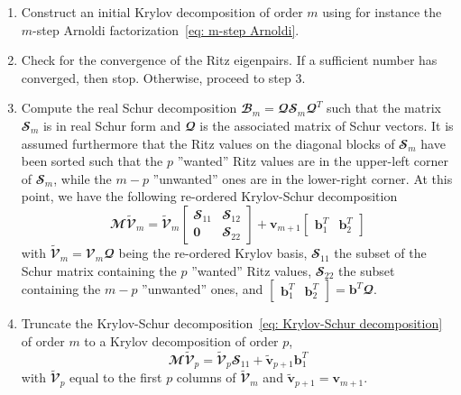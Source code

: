     \begin{enumerate}
      \item Construct an initial Krylov decomposition of order $m$ using for instance the $m$-step Arnoldi factorization~\eqref{eq: m-step Arnoldi}.

      \item Check for the convergence of the Ritz eigenpairs. If a sufficient number has converged, then stop. Otherwise, proceed to step 3.

      \item Compute the real Schur decomposition $\mathbfcal{B}_m = \mathbfcal{Q} \mathbfcal{S}_m \mathbfcal{Q}^T$ such that the matrix $\mathbfcal{S}_m$ is in real Schur form and $\mathbfcal{Q}$ is the associated matrix of Schur vectors. It is assumed furthermore that the Ritz values on the diagonal blocks of $\mathbfcal{S}_m$ have been sorted such that the $p$ ''wanted'' Ritz values are in the upper-left corner of $\mathbfcal{S}_m$, while the $m-p$ ''unwanted'' ones are in the lower-right corner. At this point, we have the following re-ordered Krylov-Schur decomposition
      \begin{equation}
        \mathbfcal{M} \tilde{\mathbfcal{V}}_m =
        \tilde{\mathbfcal{V}}_m
        \begin{bmatrix}
         \mathbfcal{S}_{11} & \mathbfcal{S}_{12} \\
         {\mathbf 0}     & \mathbfcal{S}_{22}
       \end{bmatrix}
       + {\mathbf v}_{m+1}\begin{bmatrix}
                           {\mathbf b}_{1}^T & {\mathbf b}_{2}^T
                           \end{bmatrix}
        \label{eq: Krylov-Schur decomposition}
      \end{equation}
      with $\tilde{\mathbfcal{V}}_m = \mathbfcal{V}_m  \mathbfcal{Q}$ being the re-ordered Krylov basis, $\mathbfcal{S}_{11}$ the subset of the Schur matrix containing the $p$ ''wanted'' Ritz values, $\mathbfcal{S}_{22}$ the subset containing the $m-p$ ''unwanted'' ones, and $\begin{bmatrix} {\mathbf b}_1^T & {\mathbf b}_2^T \end{bmatrix} = {\mathbf b}^T \mathbfcal{Q}$.

      \item Truncate the Krylov-Schur decomposition~\eqref{eq: Krylov-Schur decomposition} of order $m$ to a Krylov decomposition of order $p$,
        \begin{equation}
          \mathbfcal{M}\tilde{\mathbfcal{V}}_p = \tilde{\mathbfcal{V}}_p \mathbfcal{S}_{11} + \tilde{\mathbf v}_{p+1}{\mathbf b}_1^T
        \end{equation}
      with $\tilde{\mathbfcal{V}}_p$ equal to the first $p$ columns of $\tilde{\mathbfcal{V}}_m$ and $\tilde{\mathbf v}_{p+1} = {\mathbf v}_{m+1}$.


\end{enumerate}
